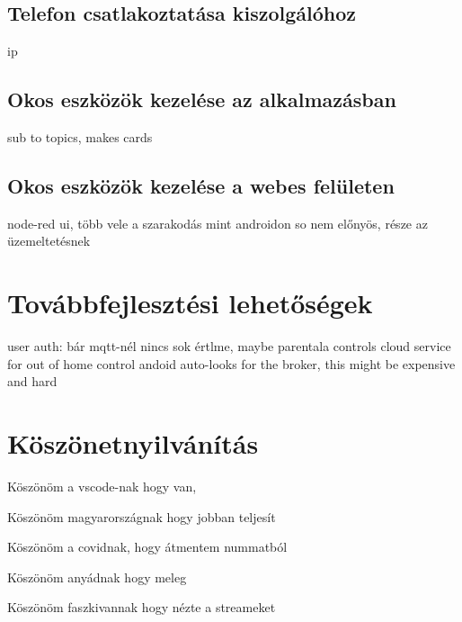 \documentclass[
]{thesis-ekf}
\theoremstyle{definition}
\theoremstyle{remark}
\begin{document}
\section{Telefon csatlakoztatása kiszolgálóhoz}
ip
\section{Okos eszközök kezelése az alkalmazásban}
sub to topics, makes cards
\section{Okos eszközök kezelése a webes felületen}
node-red ui, több vele a szarakodás mint androidon so nem előnyös, része az üzemeltetésnek


\chapter{Továbbfejlesztési lehetőségek}
user auth: bár mqtt-nél nincs sok értlme, maybe parentala controls
cloud service for out of home control
andoid auto-looks for the broker, this might be expensive and hard


\chapter*{Köszönetnyilvánítás}
\par
Köszönöm a vscode-nak hogy van,
\par
Köszönöm magyarországnak hogy jobban teljesít
\par
Köszönöm a covidnak, hogy átmentem nummatból
\par
Köszönöm anyádnak hogy meleg
\par
Köszönöm faszkivannak hogy nézte a streameket
\end{document}
